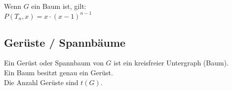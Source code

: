 \documentclass[12pt]{scrartcl}
\begin{document}
Wenn $G$ ein Baum ist, gilt:\\
$P(T_n,x) = x \cdot (x-1)^{n-1}$\\


\subsection{Gerüste / Spannbäume}
Ein Gerüst oder Spannbaum von $G$ ist ein kreisfreier Untergraph (Baum).\\

Ein Baum besitzt genau ein Gerüst.\\

Die Anzahl Gerüste sind $t(G)$.\\







\end{document}

